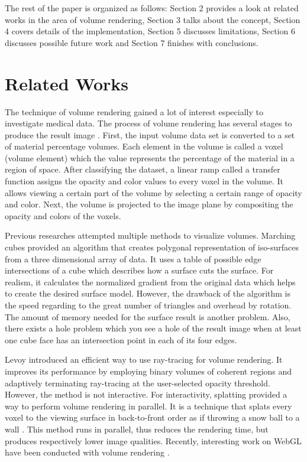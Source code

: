 \documentclass[annual]{acmsiggraph}
\begin{document}
The rest of the paper is organized as follows: Section 2 provides a look at related works in the area of volume rendering, Section 3 talks about the concept, Section 4 covers details of the implementation, Section 5 discusses limitations, Section 6 discusses possible future work and Section 7 finishes with conclusions.


\section{Related Works}
The technique of volume rendering gained a lot of interest especially to investigate medical data. The process of volume rendering has several stages to produce the result image \cite{drebin:1988}. First, the input volume data set is converted to a set of material percentage volumes. Each element in the volume is called a voxel (volume element) which the value represents the percentage of the material in a region of space. After classifying the dataset, a linear ramp called a transfer function assigns the opacity and color values to every voxel in the volume. It allows viewing a certain part of the volume by selecting a certain range of opacity and color. Next, the volume is projected to the image plane by compositing the opacity and colors of the voxels. 

Previous researches attempted multiple methods to visualize volumes. Marching cubes \cite{lorensen:1987} provided an algorithm that creates polygonal representation of iso-surfaces from a three dimensional array of data. It uses a table of possible edge intersections of a cube which describes how a surface cuts the surface. For realism, it calculates the normalized gradient from the original data which helps to create the desired surface model. However, the drawback of the algorithm is the speed regarding to the great number of triangles and overhead by rotation. The amount of memory needed for the surface result is another problem. Also, there exists a hole problem which you see a hole of the result image when at least one cube face has an intersection point in each of its four edges.

Levoy\cite{levoy:1990} introduced an efficient way to use ray-tracing for volume rendering. It improves its performance by employing binary volumes of coherent regions and adaptively terminating ray-tracing at the user-selected opacity threshold. However, the method is not interactive.
For interactivity, splatting provided a way to perform volume rendering in parallel. It is a technique that splats every voxel to the viewing surface in back-to-front order as if throwing a snow ball to a wall \cite{westover:1991}. This method runs in parallel, thus reduces the rendering time, but produces respectively lower image qualities. 
Recently, interesting work on WebGL have been conducted with volume rendering \cite{anatomical:2011}. 
\end{document}
